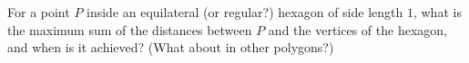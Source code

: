 For a point $P$ inside an equilateral (or regular?) hexagon of side length $1$,
what is the maximum sum of the distances between $P$ and the vertices of the hexagon,
and when is it achieved?
\newline (What about in other polygons?)
